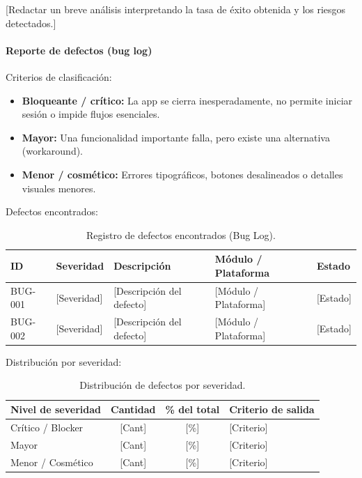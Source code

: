 \documentclass[12pt, atypical, journal]{article}
\begin{document}
[Redactar un breve análisis interpretando la tasa de éxito obtenida y los riesgos detectados.]



\paragraph{Reporte de defectos (bug log)}
Criterios de clasificación:
\begin{itemize}
    \item \textbf{Bloqueante / crítico:} La app se cierra inesperadamente, no permite iniciar sesión o impide flujos esenciales.
    \item \textbf{Mayor:} Una funcionalidad importante falla, pero existe una alternativa (workaround).
    \item \textbf{Menor / cosmético:} Errores tipográficos, botones desalineados o detalles visuales menores.
\end{itemize}

Defectos encontrados:
\begin{table}[H]
\centering
\small
\begin{tabular}{|l|l|p{5cm}|l|l|}
\hline
\textbf{ID} & \textbf{Severidad} & \textbf{Descripción} & \textbf{Módulo / Plataforma} & \textbf{Estado} \\ \hline
BUG-001 & [Severidad] & [Descripción del defecto] & [Módulo / Plataforma] & [Estado] \\ \hline
BUG-002 & [Severidad] & [Descripción del defecto] & [Módulo / Plataforma] & [Estado] \\ \hline
\end{tabular}
\caption{Registro de defectos encontrados (Bug Log).}
\label{tab:bug_log}
\end{table}

Distribución por severidad:
\begin{table}[H]
\centering
\small
\begin{tabular}{|l|c|c|p{5.5cm}|}
\hline
\textbf{Nivel de severidad} & \textbf{Cantidad} & \textbf{\% del total} & \textbf{Criterio de salida} \\ \hline
Crítico / Blocker & [Cant] & [\%] & [Criterio] \\ \hline
Mayor & [Cant] & [\%] & [Criterio] \\ \hline
Menor / Cosmético & [Cant] & [\%] & [Criterio] \\ \hline
\end{tabular}
\caption{Distribución de defectos por severidad.}
\label{tab:defectos_severidad}
\end{table}
\end{document}
